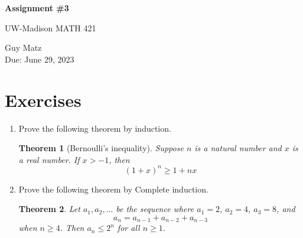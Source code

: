 \documentclass{article} %
\theoremstyle{plain}
\newtheorem*{theorem*}{Theorem}
\theoremstyle{definition}
\theoremstyle{case}
\begin{document}
\begin{center}
\Large{\textbf{Assignment \#3}
            
UW-Madison MATH 421} %
\vspace{5pt}
        
\normalsize{  Guy Matz%
        \\ Due: June 29, 2023}
\vspace{15pt}
\end{center}

\section*{Exercises}%
\begin{enumerate}[label={\fbox{\textbf{Exercise \#\arabic* :}}}]
\item Prove the following theorem by induction.  

\begin{theorem*}[Bernoulli's inequality] Suppose $n$ is a natural
  number and $x$ is a real number. If $x > -1$, then 
  \[ (1+x)^n \geq 1 + nx \]

\end{theorem*} 


\newpage
\item Prove the following theorem by Complete induction.  

 \begin{theorem*} Let $a_1,a_2,\dots$ be the sequence where $a_1=2$, $a_2=4$, $a_3=8$, and 
 $$a_n = a_{n-1}+a_{n-2}+a_{n-3}$$ 
 when $n \geq 4$. Then $a_n \leq 2^n$ for all $n \geq 1$. 
 

\end{theorem*}
\end{enumerate}
\end{document}
